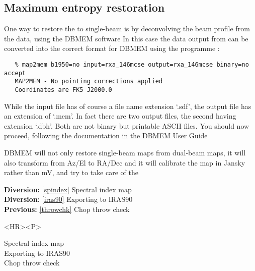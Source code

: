 \subsection{\label{dbmem}Maximum entropy restoration}

   One way to restore the
   to single-beam is by deconvolving the beam
   profile from the data, using the DBMEM software
   In this case the data output from
{\tt {}}
   can be converted into the correct format for DBMEM using the
   programme
{\tt {}}:

\begin{verbatim}
   % map2mem b1950=no input=rxa_146mcse output=rxa_146mcse binary=no accept
   MAP2MEM - No pointing corrections applied
   Coordinates are FK5 J2000.0
\end{verbatim}

   While the input file has of course a file name extension `.sdf', the
   output file has an extension of `.mem'. In fact there are two output
   files, the second having extension `.dbh'. Both are not binary but
   printable ASCII files. You should now proceed, following the
   documentation in the DBMEM User Guide

   DBMEM will not only restore single-beam maps from dual-beam maps, it
   will also transform from Az/El to RA/Dec and it will calibrate the
   map in Jansky rather than mV, and try to take care of the

\begin{latexonly}
{\bf Diversion:} \ref{spindex} Spectral index map\\
{\bf Diversion:} \ref{iras90} Exporting to IRAS90\\
{\bf Previous:} \ref{throwchk} Chop throw check\\
\end{latexonly}

\begin{htmlonly}
\begin{rawhtml} <HR><P> \end{rawhtml}
{\bf {}} Spectral index map\\
{\bf {}} Exporting to IRAS90\\
{\bf {}} Chop throw check\\
{\bf {}}\\
{\bf {}}\\
\end{htmlonly}


